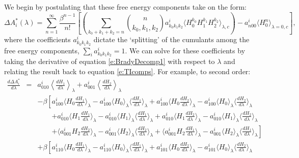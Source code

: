 \documentclass[%
 preprint,
 amsmath,amssymb,
 aps,
]{revtex4-1}
\begin{document}
We begin by postulating that these free energy components take on the form:
 \begin{equation}
\Delta A^*_i  (\lambda)=
\sum_{n=1}^{\infty}  \frac{\beta^{n-1}}{n!} 
\left[
\left(
 \sum_{k_0+k_1+k_2=n} 
{ n \choose k_0,k_1,k_2 } a^i_{k_0k_1k_2} \langle  H_0^{k_0} H_1^{k_1} H_2^{k_2} \rangle_{\lambda,c}
\right)
- a^i_{n00} \langle  H_0^{n}  \rangle_{\lambda=0,c}
\right],
\label{e:BradyDecomp1}
\end{equation}
where the coefficients $ a^i_{k_0k_1k_2}  $ dictate the `splitting' of the cumulants among the free energy components, 
$\sum_i a^i_{k_0k_1k_2} = 1$. 
We can solve for these coefficients by taking the derivative of equation \ref{e:BradyDecomp1} with respect to $\lambda$ and relating the result back to equation \ref{e:TIcomps}.  For example, to second order: 
\begin{eqnarray}
\frac{d \Delta A^*_i}{d \lambda} &=&
a^i_{010}  \left\langle \frac{dH_1}{d \lambda} \right \rangle_{\lambda} + 
a^i_{001}  \left\langle \frac{dH_2}{d \lambda} \right \rangle_{\lambda} 
\label{e:Aderv} \\ & & 
 -\beta \left[ a^i_{100} \langle  H_0 \frac{dH_1}{d \lambda}  \rangle_{\lambda} -a^i_{100} \langle  H_0 \rangle_{\lambda}  \langle \frac{dH_1}{d \lambda} \rangle_{\lambda} 
    + a^i_{100} \langle  H_0 \frac{dH_2}{d \lambda}  \rangle_{\lambda} -a^i_{100} \langle  H_0 \rangle_{\lambda}  \langle \frac{dH_2}{d \lambda} \rangle_{\lambda} 
    \right.  \nonumber  \\ & & \qquad \left. 
 +a^i_{010} \langle  H_1 \frac{dH_1}{d \lambda}  \rangle_{\lambda} -a^i_{010} \langle  H_1 \rangle_{\lambda}  \langle \frac{dH_1}{d \lambda} \rangle_{\lambda} 
  +a^i_{010} \langle  H_1 \frac{dH_2}{d \lambda}  \rangle_{\lambda} -a^i_{010} \langle  H_1 \rangle_{\lambda}  \langle \frac{dH_2}{d \lambda} \rangle_{\lambda} 
      \right.  \nonumber  \\ & & \qquad \left. 
   + \langle a^i_{001}  H_2 \frac{dH_2}{d \lambda}  \rangle_{\lambda} -a^i_{001} \langle  H_2 \rangle_{\lambda}  \langle \frac{dH_2}{d \lambda} \rangle_{\lambda} 
      + \langle a^i_{001}  H_2 \frac{dH_1}{d \lambda}  \rangle_{\lambda} -a^i_{001} \langle  H_2 \rangle_{\lambda}  \langle \frac{dH_1}{d \lambda} \rangle_{\lambda} 
  \right] \nonumber \\ & & 
   +\beta \left[ a^i_{110} \langle  H_0 \frac{dH_1}{d \lambda}  \rangle_{\lambda} -a^i_{110} \langle  H_0 \rangle_{\lambda}  \langle \frac{dH_1}{d \lambda} \rangle_{\lambda} 
    + a^i_{101} \langle  H_0 \frac{dH_2}{d \lambda}  \rangle_{\lambda} -a^i_{101} \langle  H_0 \rangle_{\lambda}  \langle \frac{dH_2}{d \lambda} \rangle_{\lambda} 

\end{eqnarray}
\end{document}
